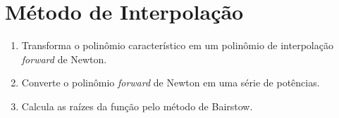 \section{Método de Interpolação}

\begin{enumerate}

\item Transforma o polinômio característico em um polinômio de interpolação \textit{forward} de Newton.

\item Converte o polinômio \textit{forward} de Newton em uma série de potências.

\item Calcula as raízes da função pelo método de Bairstow.

\end{enumerate}

